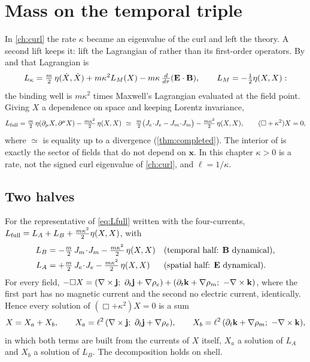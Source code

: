 \chapter{Mass on the temporal triple}
\label{ch:mass}

In \cref{ch:curl} the rate $\kappa$ became an eigenvalue of the curl and left the theory. A second lift keeps it: lift the Lagrangian of
 rather than its first-order operators. By  and  that Lagrangian is
\[
L_\kappa=\tfrac m2\,\eta(\dot X,\dot X)+m\kappa^2L_M(X)-m\kappa\,\tfrac{d}{d\tau}(\mathbf E\cdot\mathbf B),\qquad L_M=-\tfrac12\eta(X,X):
\]
the binding well is $m\kappa^2$ times Maxwell's Lagrangian evaluated at the field point. Giving $X$ a dependence on space and keeping
Lorentz invariance,
\begin{equation}
\label{eq:Lfull}
L_{\rm full}=\tfrac m2\,\eta(\partial_\mu X,\partial^\mu X)-\tfrac{m\kappa^2}2\,\eta(X,X)\ \simeq\
\tfrac m2\bigl(J_e\!\cdot\!J_e-J_m\!\cdot\!J_m\bigr)-\tfrac{m\kappa^2}2\,\eta(X,X),\qquad(\Box+\kappa^2)X=0 ,
\end{equation}
where $\simeq$ is equality up to a divergence (\cref{thm:completed}). The interior of  is exactly the sector of fields that
do not depend on $\mathbf x$. In this chapter $\kappa>0$ is a rate, not the signed curl eigenvalue of \cref{ch:curl}, and $\ell=1/\kappa$.

\section{Two halves}

\begin{theorem}
\label{thm:halves}
For the representative of \cref{eq:Lfull} written with the four-currents, $L_{\rm full}=L_A+L_B+\tfrac{m\kappa^2}2\eta(X,X)$, with
\begin{align}
L_B&=-\tfrac m2\,J_m\!\cdot\!J_m-\tfrac{m\kappa^2}2\,\eta(X,X)&&\text{(temporal half: $\mathbf B$ dynamical),}\label{eq:LB}\\
L_A&=+\tfrac m2\,J_e\!\cdot\!J_e-\tfrac{m\kappa^2}2\,\eta(X,X)&&\text{(spatial half: $\mathbf E$ dynamical).}\label{eq:LA}
\end{align}
For every field, $-\Box X=(\curl\bj;\ \partial_t\bj+\nabla\rho_e)+(\partial_t\bk+\nabla\rho_m;\ -\curl\bk)$, where the first part has no
magnetic current and the second no electric current, identically. Hence every solution of $(\Box+\kappa^2)X=0$ is a sum
\[
X=X_a+X_b,\qquad X_a=\ell^2\,(\nabla\times\mathbf j;\ \partial_t\mathbf j+\nabla\rho_e),\qquad X_b=\ell^2\,(\partial_t\mathbf k+\nabla\rho_m;\ -\nabla\times\mathbf k),
\]
in which both terms are built from the currents of $X$ itself, $X_a$ a solution of $L_A$ and $X_b$ a solution of $L_B$. The decomposition
holds on shell.
\end{theorem}

